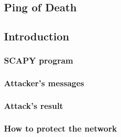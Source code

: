 \subsection{Ping of Death}
\subsection{Introduction}


\subsubsection{SCAPY program}


\subsubsection{Attacker's messages}

\subsubsection{Attack's result}


\subsubsection{How to protect the network}
